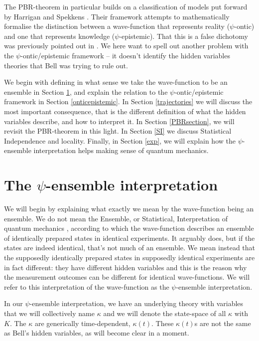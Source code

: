 \documentclass[superscriptaddress,twocolumn,floatfix,nofootinbib]{revtex4-2}
\begin{document}
The {\sc PBR}-theorem in particular builds on a classification of models put forward by Harrigan and Spekkens \cite{Harrigan2010OMF}. Their framework attempts to mathematically formalise the distinction between a wave-function that represents reality ($\psi$-ontic) and one that represents knowledge ($\psi$-epistemic). That this is a false dichotomy was previously pointed out in \cite{Hance2021Wavefunctions}. We here want to spell out another problem with the $\psi$-ontic/epistemic framework -- it doesn't identify the hidden variables theories that Bell was trying to rule out. 

We begin with defining in what sense we take the wave-function to be an ensemble in Section \ref{ensemble}, and explain the relation to the $\psi$-ontic/epistemic framework in Section \ref{onticepistemic}. In Section \ref{trajectories} we will discuss the most important consequence, that is the different definition of what the hidden variables describe, and how to interpret it. In Section \ref{PBRsection}, we will revisit the {\sc PBR}-theorem in this light. In Section \ref{SI} we discuss Statistical Independence and locality. Finally, in Section \ref{exp}, we will explain how the $\psi$-ensemble interpretation helps making sense of quantum mechanics.

\section{The \texorpdfstring{$\psi$}{psi}-ensemble interpretation}
\label{ensemble}

We will begin by explaining what exactly we mean by the wave-function being an ensemble. We do not mean the Ensemble, or Statistical, Interpretation of quantum mechanics \cite{Ballentine1970Statistical}, according to which the wave-function describes an ensemble of identically prepared states in identical experiments. It arguably does, but if the states are indeed identical, that's not much of an ensemble. We mean instead that the supposedly identically prepared states in supposedly identical experiments are in fact different: they have different hidden variables and this is the reason why the measurement outcomes can be different for identical wave-functions. We will refer to this interpretation of the wave-function as the $\psi$-ensemble interpretation.

In our $\psi$-ensemble interpretation, we have an underlying theory with variables that we will collectively name $\kappa$ and we will denote the state-space of all $\kappa$ with $K$. 
The $\kappa$ are generically time-dependent, $\kappa(t)$. 
These $\kappa(t)$s are not the same as Bell's hidden variables, as will become clear in a moment.
\end{document}
